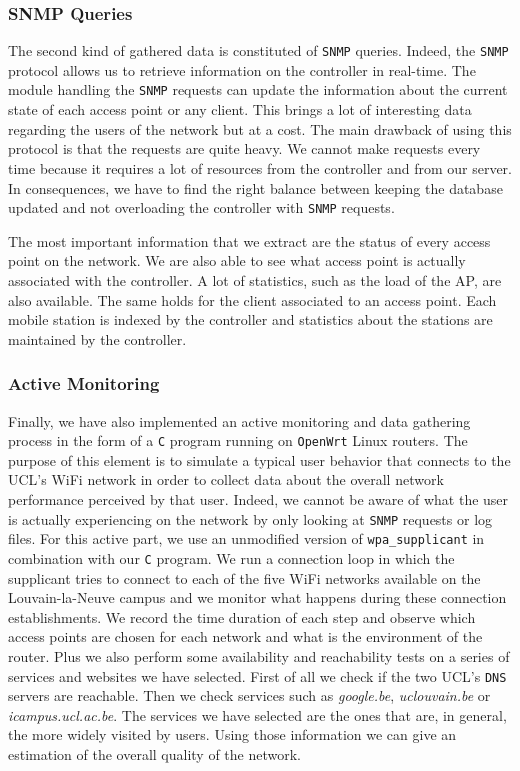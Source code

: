 \subsubsection{SNMP Queries}

The second kind of gathered data is constituted of \texttt{SNMP} queries. Indeed, the \texttt{SNMP} protocol allows us to retrieve information on the controller in real-time. The module handling the \texttt{SNMP} requests can update the information about the current state of each access point or any client. This brings a lot of interesting data regarding the users of the network but at a cost. The main drawback of using this protocol is that the requests are quite heavy. We cannot make requests every time because it requires a lot of resources from the controller and from our server. In consequences, we have to find the right balance between keeping the database updated and not overloading the controller with \texttt{SNMP} requests. 

The most important information that we extract are the status of every access point on the network. We are also able to see what access point is actually associated with the controller. A lot of statistics, such as the load of the AP, are also available. The same holds for the client associated to an access point. Each mobile station is indexed by the controller and statistics about the stations are maintained by the controller.


\subsubsection{Active Monitoring}
Finally, we have also implemented an active monitoring and data gathering process in the form of a \texttt{C} program running on \texttt{OpenWrt} Linux \cite{openwrt} routers. The purpose of this element is to simulate a typical user behavior that connects to the UCL's WiFi network in order to collect data about the overall network performance perceived by that user. Indeed, we cannot be aware of what the user is actually experiencing on the network by only looking at \texttt{SNMP} requests or log files. For this active part, we use an unmodified version of \texttt{wpa\_supplicant} in combination with our \texttt{C} program. We run a connection loop in which the supplicant tries to connect to each of the five WiFi networks available on the Louvain-la-Neuve campus and we monitor what happens during these connection establishments. We record the time duration of each step and observe which access points are chosen for each network and what is the environment of the router. Plus we also perform some availability and reachability tests on a series of services and websites we have selected. First of all we check if the two UCL's \texttt{DNS} servers are reachable. Then we check services such as \textit{google.be}, \textit{uclouvain.be} or \textit{icampus.ucl.ac.be}. The services we have selected are the ones that are, in general, the more widely visited by users. Using those information we can give an estimation of the overall quality of the network.


